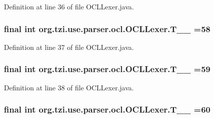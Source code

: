 Definition at line 36 of file O\-C\-L\-Lexer.\-java.

\hypertarget{classorg_1_1tzi_1_1use_1_1parser_1_1ocl_1_1_o_c_l_lexer_ab50e75590478c26884defffbb4b4b76f}{
\subsubsection[{T\-\_\-\-\_\-58}]{\setlength{\rightskip}{0pt plus 5cm}final int org.\-tzi.\-use.\-parser.\-ocl.\-O\-C\-L\-Lexer.\-T\-\_\-\-\_ =58\hspace{0.3cm}{\ttfamily [static]}}}\label{classorg_1_1tzi_1_1use_1_1parser_1_1ocl_1_1_o_c_l_lexer_ab50e75590478c26884defffbb4b4b76f}


Definition at line 37 of file O\-C\-L\-Lexer.\-java.

\hypertarget{classorg_1_1tzi_1_1use_1_1parser_1_1ocl_1_1_o_c_l_lexer_adaacf22501b2d120b29489eb529dc228}{
\subsubsection[{T\-\_\-\-\_\-59}]{\setlength{\rightskip}{0pt plus 5cm}final int org.\-tzi.\-use.\-parser.\-ocl.\-O\-C\-L\-Lexer.\-T\-\_\-\-\_ =59\hspace{0.3cm}{\ttfamily [static]}}}\label{classorg_1_1tzi_1_1use_1_1parser_1_1ocl_1_1_o_c_l_lexer_adaacf22501b2d120b29489eb529dc228}


Definition at line 38 of file O\-C\-L\-Lexer.\-java.

\hypertarget{classorg_1_1tzi_1_1use_1_1parser_1_1ocl_1_1_o_c_l_lexer_af40b4b1a7312e0dfe476c391e2ba3795}{
\subsubsection[{T\-\_\-\-\_\-60}]{\setlength{\rightskip}{0pt plus 5cm}final int org.\-tzi.\-use.\-parser.\-ocl.\-O\-C\-L\-Lexer.\-T\-\_\-\-\_ =60\hspace{0.3cm}{\ttfamily [static]}}}\label{classorg_1_1tzi_1_1use_1_1parser_1_1ocl_1_1_o_c_l_lexer_af40b4b1a7312e0dfe476c391e2ba3795}


